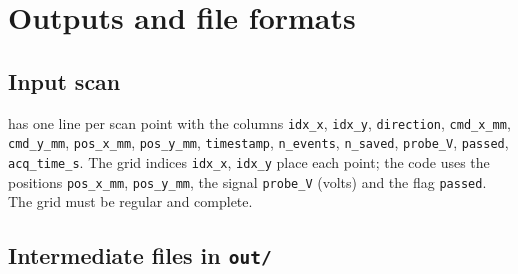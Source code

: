 \documentclass[11pt,a4paper]{article}
\newcommand{\code}[1]{\texttt{#1}}
\begin{document}
\section{Outputs and file formats}

\subsection{Input scan}

 has one line per scan point with the columns \code{idx\_x},
\code{idx\_y}, \code{direction}, \code{cmd\_x\_mm}, \code{cmd\_y\_mm}, \code{pos\_x\_mm},
\code{pos\_y\_mm}, \code{timestamp}, \code{n\_events}, \code{n\_saved}, \code{probe\_V},
\code{passed}, \code{acq\_time\_s}. The grid indices \code{idx\_x}, \code{idx\_y} place each point;
the code uses the positions \code{pos\_x\_mm}, \code{pos\_y\_mm}, the signal \code{probe\_V}
(volts) and the flag \code{passed}. The grid must be regular and complete.

\subsection{Intermediate files in \texttt{out/}}
\end{document}
